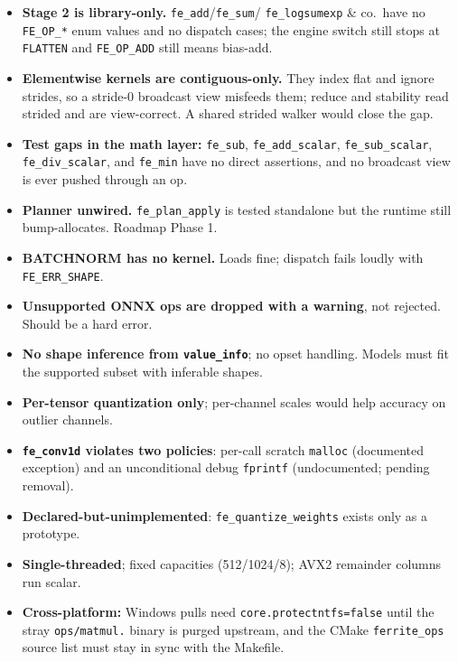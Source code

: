\documentclass[11pt,a4paper]{article}
\begin{document}
\begin{itemize}[itemsep=2pt]
\item \textbf{Stage 2 is library-only.} \texttt{fe\_add}/\texttt{fe\_sum}/
      \texttt{fe\_logsumexp} \& co.\ have no \texttt{FE\_OP\_*} enum values and
      no dispatch cases; the engine switch still stops at \texttt{FLATTEN} and
      \texttt{FE\_OP\_ADD} still means bias-add.
\item \textbf{Elementwise kernels are contiguous-only.} They index flat and
      ignore strides, so a stride-0 broadcast view misfeeds them; reduce and
      stability read strided and are view-correct. A shared strided walker
      would close the gap.
\item \textbf{Test gaps in the math layer:} \texttt{fe\_sub},
      \texttt{fe\_add\_scalar}, \texttt{fe\_sub\_scalar}, \texttt{fe\_div\_scalar},
      and \texttt{fe\_min} have no direct assertions, and no broadcast view is
      ever pushed through an op.
\item \textbf{Planner unwired.} \texttt{fe\_plan\_apply} is tested standalone
      but the runtime still bump-allocates. Roadmap Phase 1.
\item \textbf{BATCHNORM has no kernel.} Loads fine; dispatch fails loudly with
      \texttt{FE\_ERR\_SHAPE}.
\item \textbf{Unsupported ONNX ops are dropped with a warning}, not rejected.
      Should be a hard error.
\item \textbf{No shape inference from \texttt{value\_info}}; no opset handling.
      Models must fit the supported subset with inferable shapes.
\item \textbf{Per-tensor quantization only}; per-channel scales would help
      accuracy on outlier channels.
\item \textbf{\texttt{fe\_conv1d} violates two policies}: per-call scratch
      \texttt{malloc} (documented exception) and an unconditional debug
      \texttt{fprintf} (undocumented; pending removal).
\item \textbf{Declared-but-unimplemented}: \texttt{fe\_quantize\_weights} exists
      only as a prototype.
\item \textbf{Single-threaded}; fixed capacities (512/1024/8); AVX2 remainder
      columns run scalar.
\item \textbf{Cross-platform:} Windows pulls need \texttt{core.protectntfs=false}
      until the stray \texttt{ops/matmul.} binary is purged upstream, and the
      CMake \texttt{ferrite\_ops} source list must stay in sync with the
      Makefile.
\end{itemize}
\end{document}
